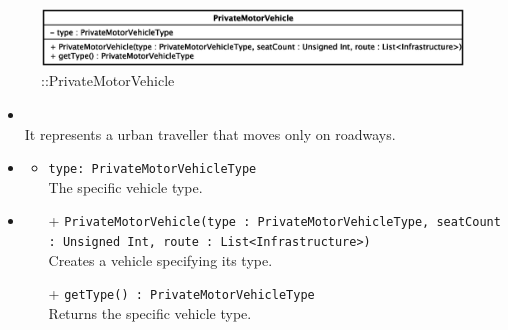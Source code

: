 \begin{figure}[h]
\centering
\includegraphics[scale=0.6,keepaspectratio]{images/solution/app/backend/private_motor_vehicle.eps}
\caption{\pActive::PrivateMotorVehicle}
\label{fig:sd-app-private-motor-vehicle}
\end{figure}
\FloatBarrier
\begin{itemize}
  \item \textbf{\descr} \\
It represents a urban traveller that moves only on roadways.
  \item \textbf{\attrs}
  \begin{itemize}
    \item \texttt{type: PrivateMotorVehicleType} \\
    The specific vehicle type.
  \end{itemize}
  \item \textbf{\ops}
  \begin{itemize}
  \item[+] \texttt{PrivateMotorVehicle(type : PrivateMotorVehicleType, seatCount : Unsigned Int, route : List<Infrastructure>)} \\
Creates a vehicle specifying its type.
    \item[+] \texttt{getType() : PrivateMotorVehicleType} \\
Returns the specific vehicle type.
  \end{itemize}
\end{itemize} 
